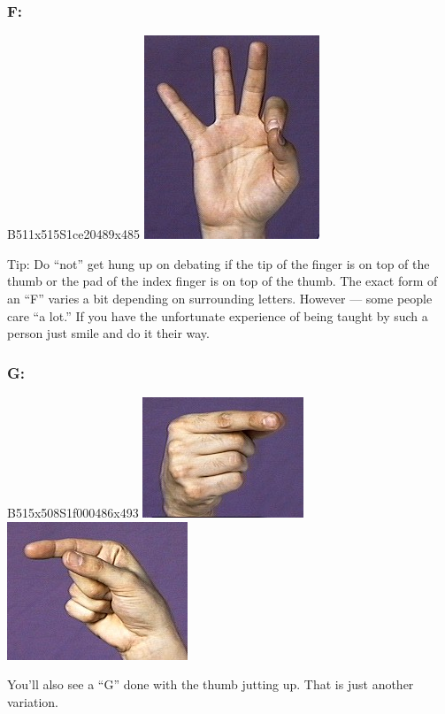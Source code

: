 \documentclass{article}
\begin{document}
\subsubsection{F:}

B511x515S1ce20489x485 \includegraphics[scale=0.5]{images/f.jpg}

Tip:
Do ``not'' get hung up on debating if the tip of the finger is on top of the thumb or the pad of the index finger is on top of the thumb.
The exact form of an ``F'' varies a bit depending on surrounding letters.
However --- some people care ``a lot.''
If you have the unfortunate experience of being taught by such a person just smile and do it their way.

\subsubsection{G:}

B515x508S1f000486x493 \includegraphics[scale=0.5]{images/g1.jpg} \includegraphics[scale=0.5]{images/g2.jpg}

You'll also see a ``G'' done with the thumb jutting up.
That is just another variation.
\end{document}
